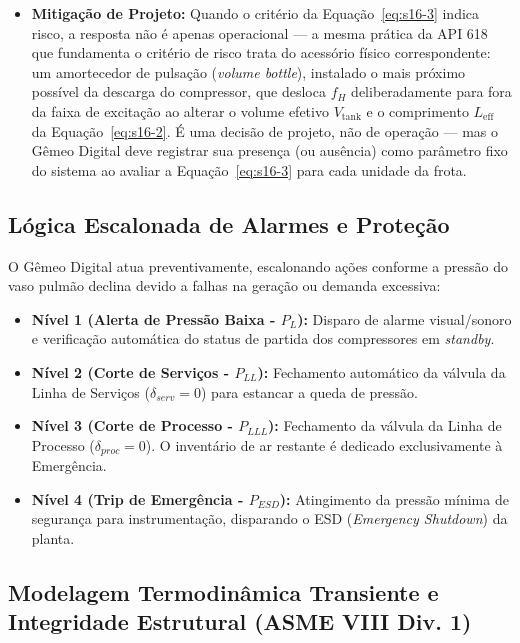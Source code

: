 \documentclass[12pt,a4paper]{article}
\numberwithin{equation}{section}
\numberwithin{table}{section}
\numberwithin{figure}{section}
\begin{document}
{\begin{itemize}
	\item \textbf{Mitigação de Projeto:} Quando o critério da Equação~\eqref{eq:s16-3} indica risco, a resposta não é apenas operacional — a mesma prática da API 618 \cite{api618} que fundamenta o critério de risco trata do acessório físico correspondente: um amortecedor de pulsação (\textit{volume bottle}), instalado o mais próximo possível da descarga do compressor, que desloca $f_H$ deliberadamente para fora da faixa de excitação ao alterar o volume efetivo $V_{\text{tank}}$ e o comprimento $L_{\text{eff}}$ da Equação~\eqref{eq:s16-2}. É uma decisão de projeto, não de operação — mas o Gêmeo Digital deve registrar sua presença (ou ausência) como parâmetro fixo do sistema ao avaliar a Equação~\eqref{eq:s16-3} para cada unidade da frota.
\end{itemize}

\subsection{Lógica Escalonada de Alarmes e Proteção}

O Gêmeo Digital atua preventivamente, escalonando ações conforme a pressão do vaso pulmão declina devido a falhas na geração ou demanda excessiva:

\begin{itemize}
	\item \textbf{Nível 1 (Alerta de Pressão Baixa - $P_{L}$):} Disparo de alarme visual/sonoro e verificação automática do status de partida dos compressores em \textit{standby}.
	\item \textbf{Nível 2 (Corte de Serviços - $P_{LL}$):} Fechamento automático da válvula da Linha de Serviços ($\delta_{serv} = 0$) para estancar a queda de pressão.
	\item \textbf{Nível 3 (Corte de Processo - $P_{LLL}$):} Fechamento da válvula da Linha de Processo ($\delta_{proc} = 0$). O inventário de ar restante é dedicado exclusivamente à Emergência.
	\item \textbf{Nível 4 (Trip de Emergência - $P_{ESD}$):} Atingimento da pressão mínima de segurança para instrumentação, disparando o ESD (\textit{Emergency Shutdown}) da planta.
\end{itemize}

\subsection{Modelagem Termodinâmica Transiente e Integridade Estrutural (ASME VIII Div. 1)}

}
\end{document}
